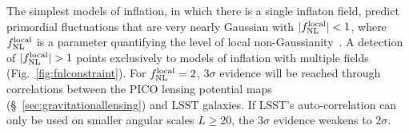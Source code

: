 \documentclass[PICOAPC.tex]{subfiles}
\begin{document}
The simplest models of inflation, in which there is a single inflaton field, predict primordial fluctuations that are very nearly Gaussian with $|f^{\rm local}_{\rm NL}| <1$, where $f^{\rm local}_{\rm NL}$ is a parameter quantifying the level of local non-Gaussianity~\citep{planck2015_17}. A detection of $|f^{\rm local}_{\rm NL}| >1$ points exclusively to models of inflation with multiple fields (Fig.~\ref{fig:fnlconstraint}). 
For $f^{\rm local}_{\rm NL}=2$, $3\sigma$ evidence will be reached through correlations between the PICO lensing potential maps (\S~\ref{sec:gravitationallensing}) and LSST galaxies. If LSST's auto-correlation can only be used on smaller angular scales $L\ge 20$, the $3\sigma$ evidence weakens to $2\sigma$. 





\end{document}
